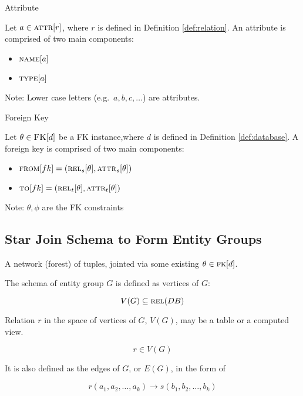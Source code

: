 		\begin{defn}{Attribute}
		
			Let $a \in \textsc{attr}\lbrack r\rbrack$, where $r$ is defined in Definition \ref{def:relation}.  An attribute is comprised of two main components:
			
			\begin{itemize}
				\item $\textsc{name}\lbrack a\rbrack$
				\item $\textsc{type}\lbrack a\rbrack$
			\end{itemize}
		
			Note:  Lower case letters (e.g.\ $a, b, c, \ldots$) are attributes.
		\end{defn}
		
		\begin{defn}{Foreign Key}
		
			Let $\theta \in \textsc{FK}\lbrack d\rbrack$ be a FK instance,where $d$ is defined in Definition \ref{def:database}.  A foreign key is comprised of two main components:
			
			\begin{itemize}
				\item $\textsc{from}\lbrack fk\rbrack = (\textsc{rel}_{s}\lbrack\theta\rbrack, \textsc{attr}_{s}\lbrack\theta\rbrack)$
				\item $\textsc{to}\lbrack fk\rbrack = (\textsc{rel}_{t}\lbrack\theta\rbrack, \textsc{attr}_{t}\lbrack\theta\rbrack)$
			\end{itemize}
			
			Note:  $\theta, \phi$ are the FK constraints
		\end{defn}
	
	\subsection{Star Join Schema to Form Entity Groups}
		A network (forest) of tuples, jointed via some existing $\theta \in \textsc{fk}\lbrack d\rbrack$.
		
		The schema of entity group $G$ is defined as vertices of $G$:
		
		$$V(G) \subseteq \textsc{rel}(DB)$$
		
		Relation $r$ in the space of vertices of $G$, $V(G)$, may be a table or a computed view.
		
		$$r \in V(G)$$
		
		It is also defined as the edges of $G$, or $E(G)$, in the form of
		
		$$r(a_1, a_2, \ldots, a_k) \rightarrow s(b_1, b_2, \ldots, b_k)$$
		
